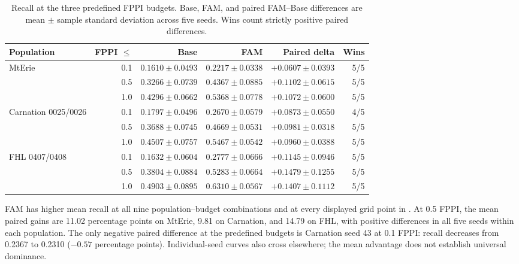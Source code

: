 \begin{table}[htbp]
  \centering
  \caption{Recall at the three predefined FPPI budgets. Base, FAM, and paired
  FAM--Base differences are mean \(\pm\) sample standard deviation across five
  seeds. Wins count strictly positive paired differences.}
  \label{tab:recall-fppi}
  \begin{adjustbox}{max width=\textwidth}
  \begin{tabular}{lrrrrr}
    \toprule
    Population & FPPI $\leq$ & Base & FAM & Paired delta & Wins \\
    \midrule
    MtErie & 0.1 & $0.1610\pm0.0493$ & $0.2217\pm0.0338$ & $+0.0607\pm0.0393$ & 5/5 \\
           & 0.5 & $0.3266\pm0.0739$ & $0.4367\pm0.0885$ & $+0.1102\pm0.0615$ & 5/5 \\
           & 1.0 & $0.4296\pm0.0662$ & $0.5368\pm0.0778$ & $+0.1072\pm0.0600$ & 5/5 \\
    \midrule
    Carnation 0025/0026 & 0.1 & $0.1797\pm0.0496$ & $0.2670\pm0.0579$ & $+0.0873\pm0.0550$ & 4/5 \\
                       & 0.5 & $0.3688\pm0.0745$ & $0.4669\pm0.0531$ & $+0.0981\pm0.0318$ & 5/5 \\
                       & 1.0 & $0.4507\pm0.0757$ & $0.5467\pm0.0542$ & $+0.0960\pm0.0388$ & 5/5 \\
    \midrule
    FHL 0407/0408 & 0.1 & $0.1632\pm0.0604$ & $0.2777\pm0.0666$ & $+0.1145\pm0.0946$ & 5/5 \\
                  & 0.5 & $0.3804\pm0.0884$ & $0.5283\pm0.0664$ & $+0.1479\pm0.1255$ & 5/5 \\
                  & 1.0 & $0.4903\pm0.0895$ & $0.6310\pm0.0567$ & $+0.1407\pm0.1112$ & 5/5 \\
    \bottomrule
  \end{tabular}
  \end{adjustbox}
\end{table}

FAM has higher mean recall at all nine population--budget combinations and
at every displayed grid point in . At 0.5 FPPI, the mean
paired gains are 11.02 percentage points on MtErie, 9.81 on Carnation, and
14.79 on FHL, with positive differences in all five seeds within each
population. The only negative paired difference at the predefined budgets is
Carnation seed 43 at 0.1 FPPI: recall decreases from 0.2367 to 0.2310
(\(-0.57\) percentage points). Individual-seed curves also cross elsewhere;
the mean advantage does not establish universal dominance.

